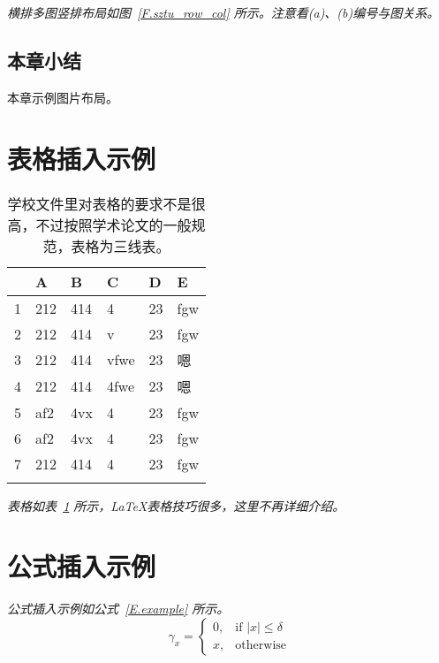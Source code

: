 \emph{横排多图竖排布局如图~\ref{F.sztu_row_col} 所示。注意看(a)、(b)编号与图关系。}

\subsection{本章小结}
本章示例图片布局。



\section{表格插入示例}

\begin{table}[htb]
  \centering
  \caption{学校文件里对表格的要求不是很高，不过按照学术论文的一般规范，表格为三线表。}
  \label{T.example}
  \begin{tabular}{llllll}
  \hline
   & A  & B  & C  & D  & E \\
  \hline
1 	& 212 & 414 & 4 		& 23 & fgw	\\
2 	& 212 & 414 & v 		& 23 & fgw	\\
3 	& 212 & 414 & vfwe		& 23 & 嗯	\\
4 	& 212 & 414 & 4fwe		& 23 & 嗯	\\
5 	& af2 & 4vx & 4 		& 23 & fgw	\\
6 	& af2 & 4vx & 4 		& 23 & fgw	\\
7 	& 212 & 414 & 4 		& 23 & fgw	\\

\hline{}
\end{tabular}
\end{table}

\emph{表格如表~\ref{T.example} 所示，\LaTeX 表格技巧很多，这里不再详细介绍。}

\lipsum


\section{公式插入示例}

\lipsum

\emph{公式插入示例如公式~\eqref{E.example} 所示。}
\begin{equation}
\gamma_x=
\begin{cases}
  0, & \text{if $|x| \leq \delta$} \\
  x, & \text{otherwise}
\end{cases}
\label{E.example}
\end{equation}


